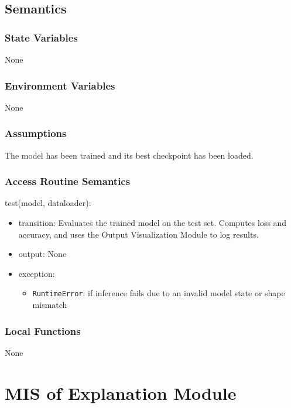 \documentclass[12pt, titlepage]{article}
\begin{document}
\subsection{Semantics}

\subsubsection{State Variables}
None

\subsubsection{Environment Variables}
None

\subsubsection{Assumptions}
The model has been trained and its best checkpoint has been loaded.

\subsubsection{Access Routine Semantics}

\noindent test(model, dataloader):
\begin{itemize}
\item transition: Evaluates the trained model on the test set. Computes loss and accuracy, and uses the Output Visualization Module to log results.
\item output: None
\item exception:     
    \begin{itemize}
        \item \texttt{RuntimeError}: if inference fails due to an invalid model state or shape mismatch
    \end{itemize}
\end{itemize}

\subsubsection{Local Functions}
None














\section{MIS of Explanation Module} \label{Explanation}
\end{document}
